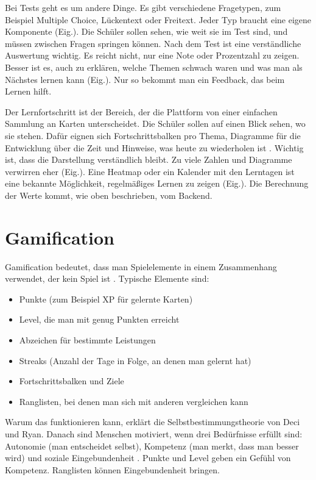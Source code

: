 Bei Tests geht es um andere Dinge. Es gibt verschiedene Fragetypen, zum Beispiel Multiple Choice, Lückentext oder Freitext. Jeder Typ braucht eine eigene Komponente (Eig.). Die Schüler sollen sehen, wie weit sie im Test sind, und müssen zwischen Fragen springen können. Nach dem Test ist eine verständliche Auswertung wichtig. Es reicht nicht, nur eine Note oder Prozentzahl zu zeigen. Besser ist es, auch zu erklären, welche Themen schwach waren und was man als Nächstes lernen kann (Eig.). Nur so bekommt man ein Feedback, das beim Lernen hilft.
 
Der Lernfortschritt ist der Bereich, der die Plattform von einer einfachen Sammlung an Karten unterscheidet. Die Schüler sollen auf einen Blick sehen, wo sie stehen. Dafür eignen sich Fortschrittsbalken pro Thema, Diagramme für die Entwicklung über die Zeit und Hinweise, was heute zu wiederholen ist \parencite{khanMastery2026}. Wichtig ist, dass die Darstellung verständlich bleibt. Zu viele Zahlen und Diagramme verwirren eher (Eig.). Eine Heatmap oder ein Kalender mit den Lerntagen ist eine bekannte Möglichkeit, regelmäßiges Lernen zu zeigen (Eig.). Die Berechnung der Werte kommt, wie oben beschrieben, vom Backend.
  
\section{Gamification}
 
Gamification bedeutet, dass man Spielelemente in einem Zusammenhang verwendet, der kein Spiel ist \parencite{deterding2011}. Typische Elemente sind:
 
\begin{itemize}
    \item Punkte (zum Beispiel XP für gelernte Karten)
    \item Level, die man mit genug Punkten erreicht
    \item Abzeichen für bestimmte Leistungen
    \item Streaks (Anzahl der Tage in Folge, an denen man gelernt hat)
    \item Fortschrittsbalken und Ziele
    \item Ranglisten, bei denen man sich mit anderen vergleichen kann
\end{itemize}
 
Warum das funktionieren kann, erklärt die Selbstbestimmungstheorie von Deci und Ryan. Danach sind Menschen motiviert, wenn drei Bedürfnisse erfüllt sind: Autonomie (man entscheidet selbst), Kompetenz (man merkt, dass man besser wird) und soziale Eingebundenheit \parencite{ryan2000}.
Punkte und Level geben ein Gefühl von Kompetenz. Ranglisten können Eingebundenheit bringen.
 

